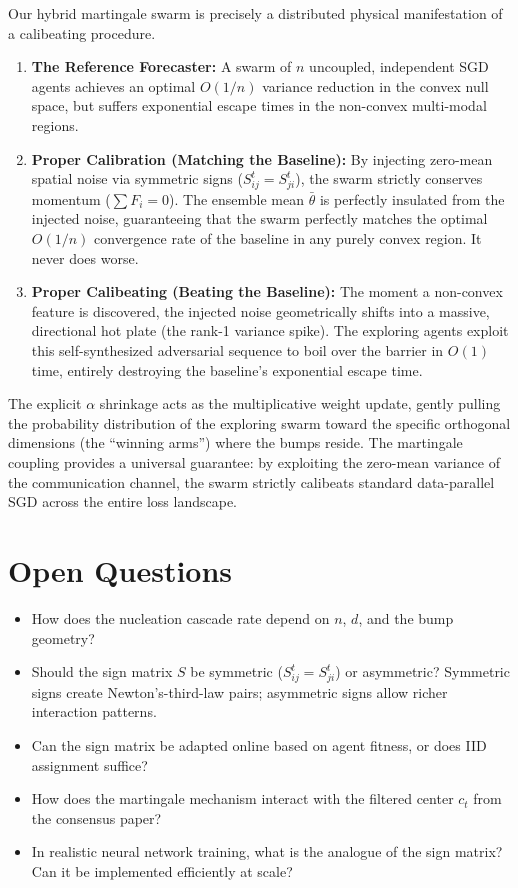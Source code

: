 \documentclass{article}
\begin{document}
Our hybrid martingale swarm is precisely a distributed physical manifestation of a calibeating procedure. 
\begin{enumerate}
    \item \textbf{The Reference Forecaster:} A swarm of $n$ uncoupled, independent SGD agents achieves an optimal $O(1/n)$ variance reduction in the convex null space, but suffers exponential escape times in the non-convex multi-modal regions.
    \item \textbf{Proper Calibration (Matching the Baseline):} By injecting zero-mean spatial noise via symmetric signs ($S_{ij}^t = S_{ji}^t$), the swarm strictly conserves momentum ($\sum F_i = 0$). The ensemble mean $\bar{\theta}$ is perfectly insulated from the injected noise, guaranteeing that the swarm perfectly matches the optimal $O(1/n)$ convergence rate of the baseline in any purely convex region. It never does worse.
    \item \textbf{Proper Calibeating (Beating the Baseline):} The moment a non-convex feature is discovered, the injected noise geometrically shifts into a massive, directional hot plate (the rank-1 variance spike). The exploring agents exploit this self-synthesized adversarial sequence to boil over the barrier in $O(1)$ time, entirely destroying the baseline's exponential escape time. 
\end{enumerate}

The explicit $\alpha$ shrinkage acts as the multiplicative weight update, gently pulling the probability distribution of the exploring swarm toward the specific orthogonal dimensions (the ``winning arms'') where the bumps reside. The martingale coupling provides a universal guarantee: by exploiting the zero-mean variance of the communication channel, the swarm strictly calibeats standard data-parallel SGD across the entire loss landscape.

\section{Open Questions}

\begin{itemize}
  \item How does the nucleation cascade rate depend on $n$, $d$, and the
    bump geometry?
  \item Should the sign matrix $S$ be symmetric ($S_{ij}^t = S_{ji}^t$) or
    asymmetric? Symmetric signs create Newton's-third-law pairs;
    asymmetric signs allow richer interaction patterns.
  \item Can the sign matrix be adapted online based on agent fitness, or
    does IID assignment suffice?
  \item How does the martingale mechanism interact with the filtered
    center $c_t$ from the consensus paper?
  \item In realistic neural network training, what is the analogue of the
    sign matrix? Can it be implemented efficiently at scale?
\end{itemize}



\end{document}
